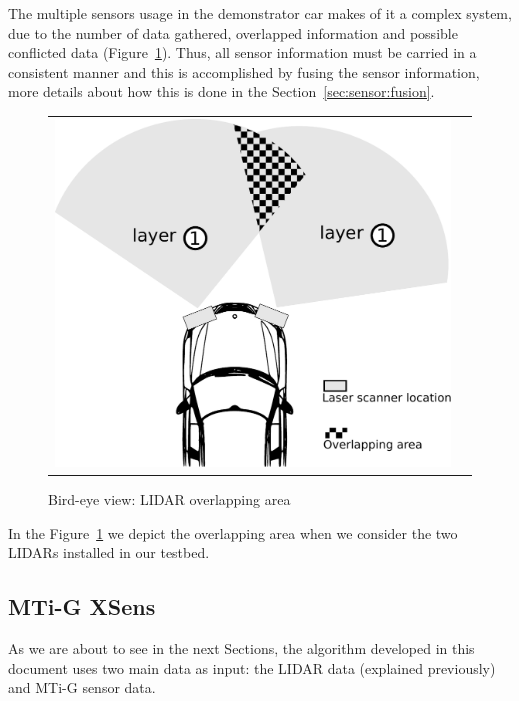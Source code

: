 The multiple sensors usage in the demonstrator car makes of it a complex system, due to the number of data gathered, overlapped information and possible conflicted data (Figure~\ref{fig:demonstrator:superior:overlap}). Thus, all sensor information must be carried in a consistent manner and this is accomplished by fusing the sensor information, more details about how this is done in the Section~\ref{sec:sensor:fusion}.

\begin{figure}[h]
   \centering
     \begin{tabular}{lr}
       \includegraphics[scale=0.5]{img/fig:demonstrator:superior:overlap}
     \end{tabular}
   \caption{Bird-eye view: LIDAR overlapping area}
   \label{fig:demonstrator:superior:overlap}
\end{figure}

In the Figure~\ref{fig:demonstrator:superior:overlap} we depict the overlapping area when we consider the two LIDARs installed in our testbed.

\subsection{MTi-G XSens}

As we are about to see in the next Sections, the algorithm developed in this document uses two main data as input: the LIDAR data (explained previously) and MTi-G sensor data.

